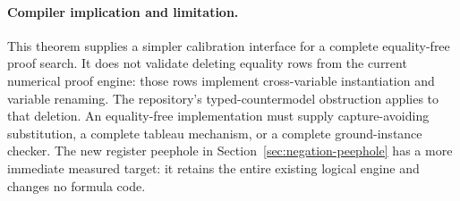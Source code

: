 \paragraph{Compiler implication and limitation.}
This theorem supplies a simpler calibration interface for a complete
equality-free proof search.  It does not validate deleting equality rows
from the current numerical proof engine: those rows implement cross-variable
instantiation and variable renaming.  The repository's typed-countermodel
obstruction applies to that deletion.  An equality-free implementation must
supply capture-avoiding substitution, a complete tableau mechanism, or a
complete ground-instance checker.  The new register peephole in
Section~\ref{sec:negation-peephole} has a more immediate measured target:
it retains the entire existing logical engine and changes no formula code.
